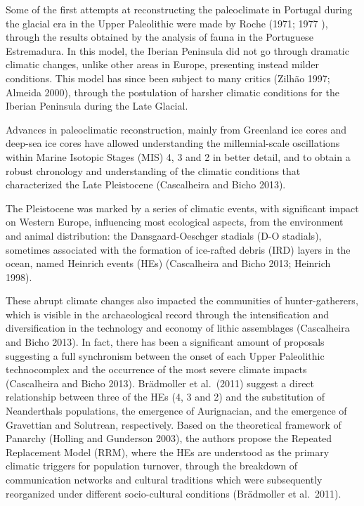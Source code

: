 \documentclass[12pt,twoside]{reedthesis}
\begin{document}
Some of the first attempts at reconstructing the paleoclimate in Portugal during the glacial era in the Upper Paleolithic were made by Roche (1971; 1977 ), through the results obtained by the analysis of fauna in the Portuguese Estremadura. In this model, the Iberian Peninsula did not go through dramatic climatic changes, unlike other areas in Europe, presenting instead milder conditions. This model has since been subject to many critics (Zilhão 1997; Almeida 2000), through the postulation of harsher climatic conditions for the Iberian Peninsula during the Late Glacial.

Advances in paleoclimatic reconstruction, mainly from Greenland ice cores and deep-sea ice cores have allowed understanding the millennial-scale oscillations within Marine Isotopic Stages (MIS) 4, 3 and 2 in better detail, and to obtain a robust chronology and understanding of the climatic conditions that characterized the Late Pleistocene (Cascalheira and Bicho 2013).

The Pleistocene was marked by a series of climatic events, with significant impact on Western Europe, influencing most ecological aspects, from the environment and animal distribution: the Dansgaard-Oeschger stadials (D-O stadials), sometimes associated with the formation of ice-rafted debris (IRD) layers in the ocean, named Heinrich events (HEs) (Cascalheira and Bicho 2013; Heinrich 1998).

These abrupt climate changes also impacted the communities of hunter-gatherers, which is visible in the archaeological record through the intensification and diversification in the technology and economy of lithic assemblages (Cascalheira and Bicho 2013). In fact, there has been a significant amount of proposals suggesting a full synchronism between the onset of each Upper Paleolithic technocomplex and the occurrence of the most severe climate impacts (Cascalheira and Bicho 2013). Brädmoller et al.~(2011) suggest a direct relationship between three of the HEs (4, 3 and 2) and the substitution of Neanderthals populations, the emergence of Aurignacian, and the emergence of Gravettian and Solutrean, respectively. Based on the theoretical framework of Panarchy (Holling and Gunderson 2003), the authors propose the Repeated Replacement Model (RRM), where the HEs are understood as the primary climatic triggers for population turnover, through the breakdown of communication networks and cultural traditions which were subsequently reorganized under different socio-cultural conditions (Brädmoller et al.~2011).
\end{document}
